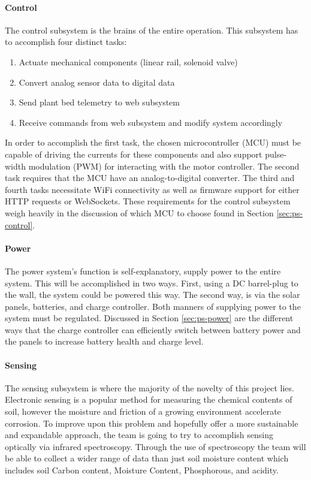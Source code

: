 \paragraph{Control}
The control subsystem is the brains of the entire operation. This subsystem has to accomplish four distinct tasks:
\begin{enumerate}
    \item Actuate mechanical components (linear rail, solenoid valve)
    \item Convert analog sensor data to digital data
    \item Send plant bed telemetry to web subsystem
    \item Receive commands from web subsystem and modify system accordingly
\end{enumerate}
In order to accomplish the first task, the chosen microcontroller (MCU) must be capable of driving the currents for these components and also support pulse-width modulation (PWM) for interacting with the motor controller. The second task requires that the MCU have an analog-to-digital converter. The third and fourth tasks necessitate WiFi connectivity as well as firmware support for either HTTP requests or WebSockets. These requirements for the control subsystem weigh heavily in the discussion of which MCU to choose found in Section \ref{sec:ps-control}.
\paragraph{Power}
The power system's function is self-explanatory, supply power to the entire system. This will be accomplished in two ways. First, using a DC barrel-plug to the wall, the system could be powered this way. The second way, is via the solar panels, batteries, and charge controller. Both manners of supplying power to the system must be regulated. Discussed in Section \ref{sec:ps-power} are the different ways that the charge controller can efficiently switch between battery power and the panels to increase battery health and charge level.
\paragraph{Sensing}
The sensing subsystem is where the majority of the novelty of this project lies. Electronic sensing is a popular method for measuring the chemical contents of soil, however the moisture and friction of a growing environment accelerate corrosion. To improve upon this problem and hopefully offer a more sustainable and expandable approach, the team is going to try to accomplish sensing optically via infrared spectroscopy. Through the use of spectroscopy the team will be able to collect a wider range of data than just soil moisture content which includes soil Carbon content, Moisture Content, Phosphorous, and acidity.
